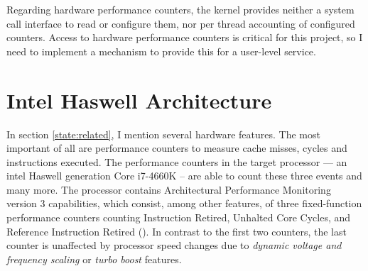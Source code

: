 Regarding hardware performance counters, the kernel provides neither a system
call interface to read or configure them, nor per thread accounting of
configured counters.
Access to hardware performance counters is critical for this project, so I need
to implement a mechanism to provide this for a user-level service.



\begin{comment}
\textbf{Fiasco.OC}
\begin{itemize}
  \item Kernel scheduler does no balancing, assigns thread to the first
    core specified in the affinity descriptor
  \item affinity descriptor: core(s) a thread should run on
  \item Syscall via run\_thread() to pass affinity descr to kernel scheduler
  \item interface to query execution time for each thread
  \item capability system -- to derive communication relationships from
  \item	Kernel feature wishes derived from related work: Performance counters
    and per thread accounting
\end{itemize}

\textbf{L4Re}
\begin{itemize}
  \item provides scheduler proxy interface, including affinity descriptor,
    scheduling parameters
  \item syscall interface
\end{itemize}
\end{comment}



\section{Intel Haswell Architecture}
\label{state:haswell}

In section \ref{state:related}, I mention several hardware features.
The most important of all are performance counters to measure cache misses,
cycles and instructions executed.
The performance counters in the target processor --- an \gls{intel} Haswell
generation Core i7-4660K -- are able to count these three events and many more.
The processor contains Architectural Performance Monitoring version 3
capabilities, which consist, among other features, of three fixed-function
performance counters counting Instruction Retired, Unhalted Core Cycles, and
Reference Instruction Retired (\cite{intel_arch_ref_manual_2015}).
In contrast to the first two counters, the last counter is unaffected by
processor speed changes due to \emph{dynamic voltage and frequency scaling} or \textit{turbo boost} features.

